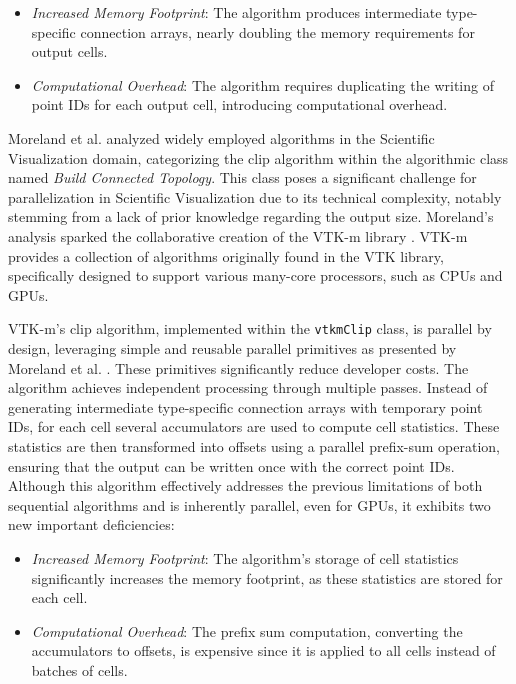 \documentclass{egpubl}
\begin{document}
\begin{itemize}
    \item \textit{Increased Memory Footprint}: The algorithm produces intermediate type-specific connection arrays, nearly doubling the memory requirements for output cells.
    \item \textit{Computational Overhead}: The algorithm requires duplicating the writing of point IDs for each output cell, introducing computational overhead.
\end{itemize}

Moreland et al. \cite{ClassSciViz} analyzed widely employed algorithms in the Scientific Visualization domain, categorizing the clip algorithm within the algorithmic class named \textit{Build Connected Topology}. This class poses a significant challenge for parallelization in Scientific Visualization due to its technical complexity, notably stemming from a lack of prior knowledge regarding the output size. Moreland's analysis sparked the collaborative creation of the VTK-m library \cite{VTKm}. VTK-m provides a collection of algorithms originally found in the VTK library, specifically designed to support various many-core processors, such as CPUs and GPUs.

VTK-m's clip algorithm, implemented within the \texttt{vtkmClip} class, is parallel by design, leveraging simple and reusable parallel primitives as presented by Moreland et al. \cite{MCD3}. These primitives significantly reduce developer costs. The algorithm achieves independent processing through multiple passes. Instead of generating intermediate type-specific connection arrays with temporary point IDs, for each cell several accumulators are used to compute cell statistics. These statistics are then transformed into offsets using a parallel prefix-sum operation, ensuring that the output can be written once with the correct point IDs. Although this algorithm effectively addresses the previous limitations of both sequential algorithms and is inherently parallel, even for GPUs, it exhibits two new important deficiencies:

\begin{itemize}
    \item \textit{Increased Memory Footprint}: The algorithm's storage of cell statistics significantly increases the memory footprint, as these statistics are stored for each cell.
    \item \textit{Computational Overhead}: The prefix sum computation, converting the accumulators to offsets, is expensive since it is applied to all cells instead of batches of cells. 
\end{itemize}
\end{document}

